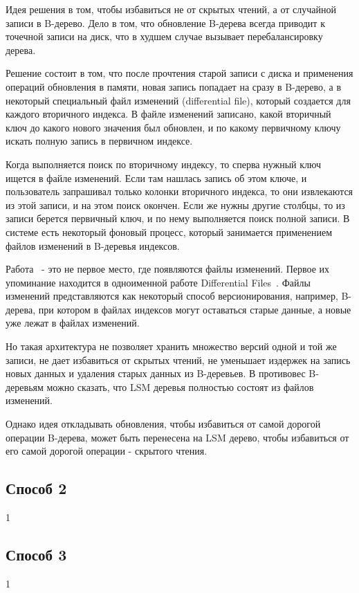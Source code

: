 \documentclass[a4paper,hidelinks,12pt]{article}
\begin{document}
Идея решения в том, чтобы избавиться не от скрытых чтений, а от случайной записи
в B-дерево. Дело в том, что обновление B-дерева всегда приводит к точечной
записи на диск, что в худшем случае вызывает перебалансировку дерева.

Решение состоит в том, что после прочтения старой записи с диска и применения
операций обновления в памяти, новая запись попадает на сразу в B-дерево, а в
некоторый специальный файл изменений (differential file), который создается для
каждого вторичного индекса. В файле изменений записано, какой вторичный ключ до
какого нового значения был обновлен, и по какому первичному ключу искать полную
запись в первичном индексе.

Когда выполняется поиск по вторичному индексу, то сперва нужный ключ ищется в
файле изменений. Если там нашлась запись об этом ключе, и пользователь
запрашивал только колонки вторичного индекса, то они извлекаются из этой записи,
и на этом поиск окончен. Если же нужны другие столбцы, то из записи берется
первичный ключ, и по нему выполняется поиск полной записи. В системе есть
некоторый фоновый процесс, который занимается применением файлов изменений в
B-деревья индексов.

Работа~\cite{btree_update_def} - это не первое место, где появляются файлы
изменений. Первое их упоминание находится в одноименной работе Differential
Files~\cite{differential_files}. Файлы изменений представляются как некоторый
способ версионирования, например, B-дерева, при котором в файлах индексов могут
оставаться старые данные, а новые уже лежат в файлах изменений.

Но такая архитектура не позволяет хранить множество версий одной и той же
записи, не дает избавиться от скрытых чтений, не уменьшает издержек на запись
новых данных и удаления старых данных из B-деревьев. В противовес B-деревьям
можно сказать, что LSM деревья полностью состоят из файлов изменений.

Однако идея откладывать обновления, чтобы избавиться от самой дорогой операции
B-дерева, может быть перенесена на LSM дерево, чтобы избавиться от его самой
дорогой операции - скрытого чтения.

\subsection{Способ 2}
1

\subsection{Способ 3}
1
\end{document}
